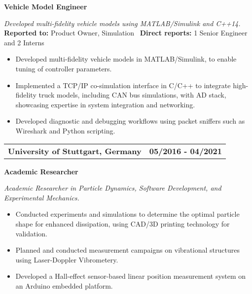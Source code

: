 \documentclass[a4paper,10pt]{article}
\begin{document}
\noindent
\colorbox{gray!40}{%
    \parbox{0.99\textwidth}{%
        \textcolor{highlightcolor}{\textbf{Vehicle Model Engineer}}
    }%
}

\vspace{0.2cm}
\noindent
\textit{Developed multi-fidelity vehicle models using MATLAB/Simulink and C++14.}\\

\vspace{-0.3cm}
\noindent
\textbf{Reported to:} Product Owner, Simulation \, \textbf{Direct reports:} 1 Senior Engineer and 2 Interns\,
\begin{itemize}[itemsep=0pt, topsep=5pt]
    \item Developed multi-fidelity vehicle models in MATLAB/Simulink, to enable tuning of controller parameters.
    \item Implemented a TCP/IP co-simulation interface in C/C++ to integrate
        high-fidelity truck models, including CAN bus simulations, with AD
        stack, showcasing expertise in system integration and networking.
    \item Developed diagnostic and debugging workflows using packet sniffers such as Wireshark and Python scripting.
\end{itemize}

\vspace{0.3cm}
\noindent
\begin{tabular}{ @{\hskip 0pt}m{} >{\raggedleft\arraybackslash}p{} }
    \noindent\textbf{University of Stuttgart, Germany} & \textbf{05/2016 - 04/2021}
\end{tabular}

\noindent
\colorbox{gray!40}{%
    \parbox{0.99\textwidth}{%
        \textcolor{highlightcolor}{\textbf{Academic Researcher}}
    }%
}

\vspace{0.2cm}
\noindent
\textit{Academic Researcher in Particle Dynamics, Software Development, and Experimental Mechanics.}\\
\vspace{-0.4cm}
\noindent
\begin{itemize}[itemsep=0pt, topsep=5pt]
    \item Conducted experiments and simulations to determine the optimal
        particle shape for enhanced dissipation, using CAD/3D printing
        technology for validation.
    \item Planned and conducted measurement campaigns on vibrational structures
        using Laser-Doppler Vibrometery.
    \item Developed a Hall-effect sensor-based linear position measurement
        system on an Arduino embedded platform.
\end{itemize}
\end{document}

